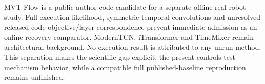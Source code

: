 MVT-Flow is a public author-code candidate for a separate offline real-robot study. Full-execution likelihood, symmetric temporal convolutions and unresolved released-code objective/layer correspondence prevent immediate admission as an online recovery comparator. ModernTCN, iTransformer and TimeMixer remain architectural background. No execution result is attributed to any unrun method. This separation makes the scientific gap explicit: the present controls test mechanism behavior, while a compatible full published-baseline reproduction remains unfinished.

